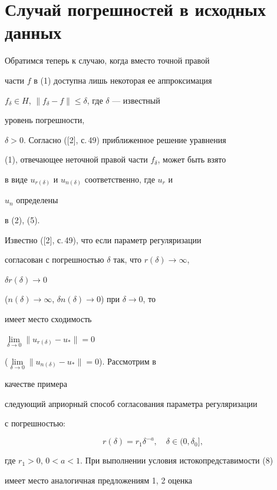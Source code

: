  


\section{Случай погрешностей в исходных данных} 


 


Обратимся теперь к случаю, когда вместо точной правой 


части $f$ в (1) доступна лишь некоторая ее аппроксимация 


$f_\delta\in H$, $\|f_\delta-f\|\le\delta$, где $\delta$ --- известный 


уровень погрешности, 


$\delta>0$. Согласно ([2], с.\,49) приближенное решение уравнения 


(1), отвечающее неточной правой части $f_\delta$, может быть взято 


в виде $u_{r(\delta)}$ и $u_{n(\delta)}$ соответственно, где $u_r$ и 


$u_n$ определены 


в (2), (5). 


 


Известно ([2], с.\,49), что если параметр регуляризации 


согласован с погрешностью $\delta$ так, что $r(\delta)\to\infty$, 


$\delta{}r(\delta)\to0$ 


($n(\delta)\to\infty$, $\delta{}n(\delta)\to0$) при $\delta\to0$, то 


имеет место сходимость 


$\lim\limits_{\delta\to0}\|u_{r(\delta)}-u_*\|=0$ 


($\lim\limits_{\delta\to0}\|u_{n(\delta)}-u_*\|=0$). Рассмотрим в 


качестве примера 


следующий априорный способ согласования параметра регуляризации 


с погрешностью: 


\begin{equation} 


r(\delta)=r_1\delta^{-a},\quad \delta\in(0,\delta_0], 


\end{equation} 


где $r_1>0$, $0<a<1$. При выполнении условия истокопредставимости (8) 


имеет место аналогичная предложениям 1, 2 оценка 


